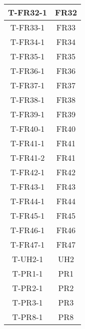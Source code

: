 \documentclass[12pt, titlepage]{article}
\begin{document}
\begin{center}
\begin{longtable}{ |c|c| }
            \hline
            T-FR32-1    & FR32 \\ 
            \hline
            T-FR33-1    & FR33 \\ 
            \hline
            T-FR34-1    & FR34 \\ 
            \hline
            T-FR35-1    & FR35 \\ 
            \hline
            T-FR36-1    & FR36 \\ 
            \hline
            T-FR37-1    & FR37 \\ 
            \hline
            T-FR38-1    & FR38 \\ 
            \hline
            T-FR39-1    & FR39 \\ 
            \hline
            T-FR40-1    & FR40 \\ 
            \hline
            T-FR41-1    & FR41 \\
            T-FR41-2    & FR41 \\
            \hline
            T-FR42-1    & FR42 \\
            \hline
            T-FR43-1    & FR43 \\ 
            \hline
            T-FR44-1    & FR44 \\
            \hline
            T-FR45-1    & FR45 \\
            \hline
            T-FR46-1    & FR46 \\
            \hline
            T-FR47-1    & FR47 \\
            \hline
            \hline
            T-UH2-1     & UH2 \\ 
            \hline
            T-PR1-1     & PR1 \\ 
            \hline
            T-PR2-1     & PR2 \\ 
            \hline
            T-PR3-1     & PR3 \\ 
            \hline
            T-PR8-1     & PR8 \\ 
            \hline
        \end{longtable}
    \end{center}
\end{document}
